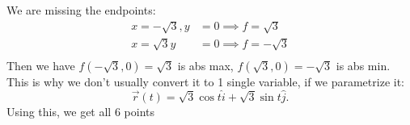 \begin{itemize}
\begin{example}
We are missing the endpoints:
\begin{align*}
	x = -\sqrt{3},  y &= 0 \implies f = \sqrt{3}   \\
	x = \sqrt{3} y &=  0 \implies f = -\sqrt{3}  \\
\end{align*}
Then we have $f\left( -\sqrt{3} ,0 \right)  = \sqrt{3} $ is abs max, $f\left( \sqrt{3} , 0 \right) = -\sqrt{3} $ is abs min.\\
This is why we don't usually convert it to 1 single variable, if we parametrize it: 
\[
\vec{r}(t) = \sqrt{3} \cos t \hat{i} + \sqrt{ 3}  \sin t \hat{j}
.\] Using this, we get all 6 points
		\end{example}

\end{itemize}
